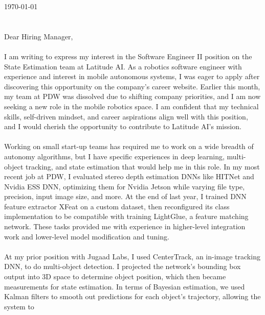 \documentclass{coverletter}
\begin{document}
\hline{0.5pt}\vspace{10pt}

\today
\\~\\~\\
Dear Hiring Manager,
\\~\\
I am writing to express my interest in the Software Engineer II position on the State Estimation
team at Latitude AI. As a robotics software engineer with experience and interest in mobile
autonomous systems, I was eager to apply after discovering this opportunity on the company's career
website. Earlier this month, my team at PDW was dissolved due to shifting company priorities, and I
am now seeking a new role in the mobile robotics space. I am confident that my technical skills,
self-driven mindset, and career aspirations align well with this position, and I would cherish the
opportunity to contribute to Latitude AI's mission. \\~\\
Working on small start-up teams has required me to work on a wide breadth of autonomy algorithms,
but I have specific experiences in deep learning, multi-object tracking, and state estimation that
would help me in this role. In my most recent job at PDW, I evaluated stereo depth estimation DNNs
like HITNet and Nvidia ESS DNN, optimizing them for Nvidia Jetson while varying file type,
precision, input image size, and more. At the end of last year, I trained DNN feature extractor
XFeat on a custom dataset, then reconfigured its class implementation to be compatible with
training LightGlue, a feature matching network. These tasks provided me with experience in
higher-level integration work and lower-level model modification and tuning. \\~\\ At my prior
position with Jugaad Labs, I used CenterTrack, an in-image tracking DNN, to do multi-object
detection. I projected the network's bounding box output into 3D space to determine object
position, which then became measurements for state estimation. In terms of Bayesian estimation, we
used Kalman filters to smooth out predictions for each object's trajectory, allowing the system to
\end{document}
